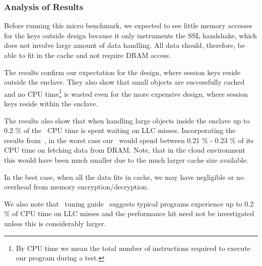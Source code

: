 \documentclass[../../../main.tex]{subfiles}
\begin{document}
\subsubsection*{Analysis of Results}
Before running this micro benchmark, we expected to see little memory
accesses for the keys outside design because it only instruments the SSL
handshake, which does not involve large amount of data handling. All data
should, therefore, be able to fit in the cache and not require DRAM access.

The results confirm our expectation for the design, where session keys reside
outside the enclave. They also show that small objects are successfully cached
and no CPU time\footnote{By CPU time we mean the total number of instructions
required to execute our program during a test.} is wasted even for the more
expensive design, where session keys reside within the enclave.

The results also show that when handling large objects inside the enclave up
to 0.2 \% of the \enclavemodel~CPU time is spent waiting on LLC misses.
Incorporating the results from~\cite{REFERENCE}, in the worst case our
\enclaveprogram~would spend between 0.21 \% - 0.23 \% of its CPU time on
fetching data from DRAM. Note, that in the cloud environment this would have
been much smaller due to the much larger cache size available.

In the best case, when all the data fits in cache, we may have negligible or
no overhead from memory encryption/decryption.

We also note that \Intel~tuning guide~\cite{intel-eqn} suggests typical
programs experience up to 0.2 \% of CPU time on LLC misses and the performance
hit need not be investigated unless this is considerably larger.
\end{document}
